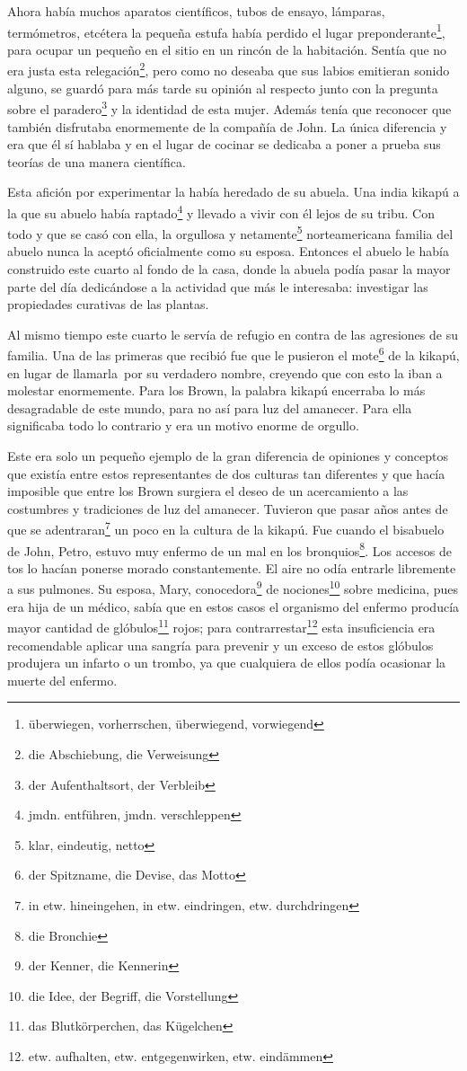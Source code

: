 Ahora había muchos aparatos científicos, tubos de ensayo, lámparas,
termómetros, etcétera \ndots la pequeña estufa había perdido el lugar preponderante\footnote{überwiegen, vorherrschen, überwiegend, vorwiegend},
para ocupar un pequeño en el sitio en un rincón de la
habitación. Sentía que no era justa esta relegación\footnote{die Abschiebung, die Verweisung},
pero como no deseaba que sus labios emitieran sonido alguno, se guardó
para más tarde su opinión al respecto junto con la pregunta sobre el paradero\footnote{der Aufenthaltsort, der Verbleib} y la
identidad de esta mujer. Además tenía que reconocer que también disfrutaba
enormemente de la compañía de John. La única diferencia y era que él sí
hablaba y en el lugar de cocinar se dedicaba a poner a prueba sus
teorías de una manera científica.

Esta afición por experimentar la había heredado de su abuela. Una india
kikapú a la que su abuelo había raptado\footnote{jmdn. entführen, jmdn. verschleppen}
y llevado a vivir con él lejos de su tribu. Con todo y que se casó con
ella, la orgullosa y netamente\footnote{klar, eindeutig, netto}
norteamericana familia del abuelo nunca la aceptó oficialmente como su
esposa. Entonces el abuelo le había construido este cuarto al fondo de
la casa, donde la abuela podía pasar la mayor parte del día dedicándose
a la actividad que más le interesaba: investigar las propiedades
curativas de las plantas.

Al mismo tiempo este cuarto le servía de refugio en contra de las
agresiones de su familia. Una de las primeras que recibió fue que le
pusieron el mote\footnote{der Spitzname, die Devise, das Motto}
de \glqq{}la kikapú\grqq{}, en lugar de llamarla~por su
verdadero nombre, creyendo que con esto la iban a molestar enormemente.
Para los Brown, la palabra kikapú encerraba lo más desagradable de este
mundo, para no así para \glqq{}luz del amanecer\grqq{}.
Para ella significaba todo lo contrario y era un motivo enorme de
orgullo.

Este era solo un pequeño ejemplo de la gran diferencia de opiniones y
conceptos que existía entre estos representantes de dos culturas tan
diferentes y que hacía imposible que entre los Brown surgiera el deseo
de un acercamiento a las costumbres y tradiciones de \glqq{}luz del amanecer\grqq{}.
Tuvieron que pasar años antes de que se adentraran\footnote{in etw. hineingehen, in etw. eindringen, etw. durchdringen}
un poco en la cultura de \glqq{}la kikapú\grqq{}. Fue cuando el bisabuelo de John,
Petro, estuvo muy enfermo de un mal en los bronquios\footnote{die Bronchie}.
Los accesos de tos lo hacían ponerse morado constantemente. El aire no
odía entrarle libremente a sus pulmones. Su esposa, Mary, conocedora\footnote{der Kenner, die Kennerin}
de nociones\footnote{die Idee, der Begriff, die Vorstellung} sobre
medicina, pues era hija de un médico, sabía que en estos casos el organismo
del enfermo producía mayor cantidad de glóbulos\footnote{das Blutkörperchen, das Kügelchen}
rojos; para contrarrestar\footnote{etw. aufhalten, etw. entgegenwirken, etw. eindämmen}
esta insuficiencia era recomendable aplicar una sangría para prevenir
y un exceso de estos glóbulos produjera un infarto o un trombo, ya que
cualquiera de ellos podía ocasionar la muerte del enfermo.

